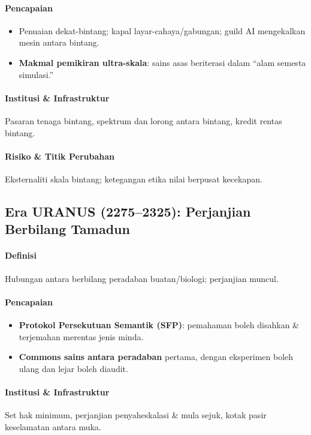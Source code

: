 \documentclass[11pt]{article}
\begin{document}
\paragraph{Pencapaian}
\begin{itemize}[noitemsep]
  \item Penuaian dekat-bintang; kapal layar-cahaya/gabungan; guild AI mengekalkan mesin antara bintang.
  \item \textbf{Makmal pemikiran ultra-skala}: sains asas beriterasi dalam ``alam semesta simulasi.''
\end{itemize}

\paragraph{Institusi \& Infrastruktur} Pasaran tenaga bintang, spektrum dan lorong antara bintang, kredit rentas bintang.

\paragraph{Risiko \& Titik Perubahan} Eksternaliti skala bintang; ketegangan etika nilai berpusat kecekapan.

\subsection{Era URANUS (2275–2325): Perjanjian Berbilang Tamadun}
\paragraph{Definisi} Hubungan antara berbilang peradaban buatan/biologi; perjanjian muncul.

\paragraph{Pencapaian}
\begin{itemize}[noitemsep]
  \item \textbf{Protokol Persekutuan Semantik (SFP)}: pemahaman boleh disahkan \& terjemahan merentas jenis minda.
  \item \textbf{Commons sains antara peradaban} pertama, dengan eksperimen boleh ulang dan lejar boleh diaudit.
\end{itemize}

\paragraph{Institusi \& Infrastruktur} Set hak minimum, perjanjian penyaheskalasi \& mula sejuk, kotak pasir keselamatan antara muka.
\end{document}
